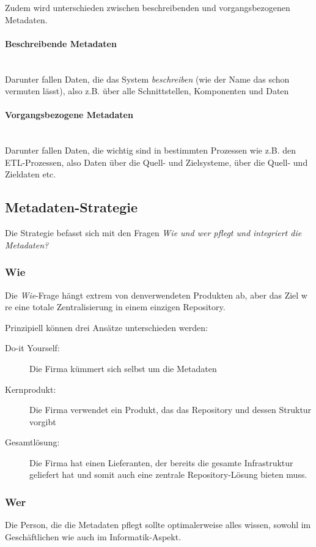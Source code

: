 \documentclass[a4paper, 11pt, nofootinbib]{article}
\begin{document}
\noindent Zudem wird unterschieden zwischen beschreibenden und vorgangsbezogenen Metadaten.

\begin{multicols}{2}
	\paragraph{Beschreibende Metadaten}\mbox{}\\
	Darunter fallen Daten, die das System \textit{beschreiben} (wie der Name das schon vermuten lässt), also z.B. über alle Schnittstellen, Komponenten und Daten
	\columnbreak
	\paragraph{Vorgangsbezogene Metadaten}\mbox{}\\
	Darunter fallen Daten, die wichtig sind in bestimmten Prozessen wie z.B. den ETL-Prozessen, also Daten über die Quell- und Zielsysteme, über die Quell- und Zieldaten etc.
\end{multicols}

\subsection{Metadaten-Strategie}
Die Strategie befasst sich mit den Fragen \textit{Wie und wer pflegt und integriert die Metadaten?}

\subsubsection{Wie}
Die \textit{Wie}-Frage hängt extrem von denverwendeten Produkten ab, aber das Ziel w
re eine totale Zentralisierung in einem einzigen Repository.

Prinzipiell können drei Ansätze unterschieden werden:

\begin{description}
	\item[Do-it Yourself: ] Die Firma kümmert sich selbst um die Metadaten
	\item[Kernprodukt: ] Die Firma verwendet ein Produkt, das das Repository und dessen Struktur vorgibt
	\item[Gesamtlösung: ] Die Firma hat einen Lieferanten, der bereits die gesamte Infrastruktur geliefert hat und somit auch eine zentrale Repository-Lösung bieten muss.
\end{description}

\subsubsection{Wer}
Die Person, die die Metadaten pflegt sollte optimalerweise alles wissen, sowohl im Geschäftlichen wie auch im Informatik-Aspekt. 
\end{document}
